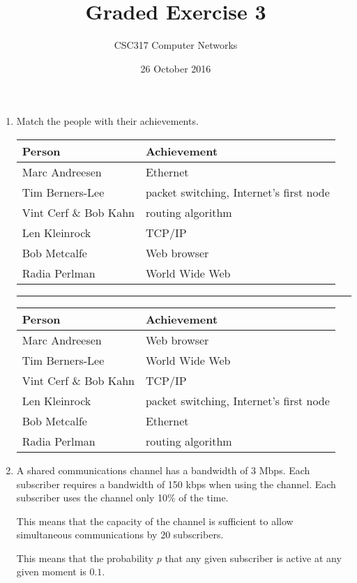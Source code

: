 \documentclass[twoside]{article}
\title{Graded Exercise 3}
\author{CSC317 Computer Networks}
\date{26 October 2016}
\newenvironment{answer}
  {\vspace*{0.2cm} \rule{12cm}{0.04cm} \vspace*{0.2cm}}
  {\vspace*{0.2cm}}
\begin{document}
\maketitle

\begin{enumerate}
  \item Match the people with their achievements.

  \begin{tabular}{l|l}
    \textbf{Person} & \textbf{Achievement} \\ \hline
    Marc Andreesen & Ethernet \\
    Tim Berners-Lee & packet switching, Internet's first node \\
    Vint Cerf \& Bob Kahn & routing algorithm \\    
    Len Kleinrock & TCP/IP \\
    Bob Metcalfe & Web browser \\
    Radia Perlman & World Wide Web
    \end{tabular}

  \begin{answer}

  \begin{tabular}{l|l}
    \textbf{Person} & \textbf{Achievement} \\ \hline
    Marc Andreesen & Web browser\\
    Tim Berners-Lee &  World Wide Web \\
    Vint Cerf \& Bob Kahn & TCP/IP \\    
    Len Kleinrock & packet switching, Internet's first node \\
    Bob Metcalfe & Ethernet \\
    Radia Perlman & routing algorithm
    \end{tabular}

    \end{answer}

  \item A shared communications channel has a bandwidth of 3 Mbps.
    Each subscriber requires a bandwidth of 150 kbps when
    using the channel.
    Each subscriber uses the channel only 10\% of the time.

    This means that the capacity of the channel is sufficient to
    allow simultaneous communications by $20$ subscribers.

    This means that the probability $p$ that any given subscriber is active at any given moment
    is $0.1$.


\end{enumerate}
\end{document}
